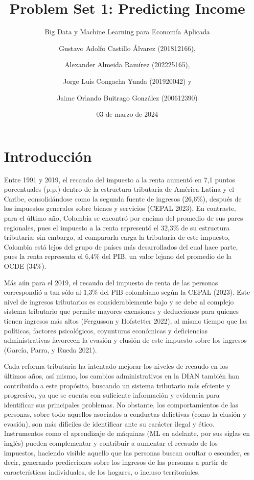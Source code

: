 \documentclass[
  11pt,
  letterpaper,
]{article}
\title{Problem Set 1: Predicting Income}
\subtitle{Big Data y Machine Learning para Economía Aplicada}
\author{Gustavo Adolfo Castillo Álvarez (201812166), \and Alexander
Almeida Ramírez (202225165), \and Jorge Luis Congacha Yunda (201920042)
y \and Jaime Orlando Buitrago González (200612390)}
\date{03 de marzo de 2024}
\begin{document}
\maketitle

\hypertarget{introducciuxf3n}{%
\section{Introducción}\label{introducciuxf3n}}

Entre 1991 y 2019, el recaudo del impuesto a la renta aumentó en 7,1
puntos porcentuales (p.p.) dentro de la estructura tributaria de América
Latina y el Caribe, consolidándose como la segunda fuente de ingresos
(26,6\%), después de los impuestos generales sobre bienes y servicios
(CEPAL 2023). En contraste, para el último año, Colombia se encontró por
encima del promedio de sus pares regionales, pues el impuesto a la renta
representó el 32,3\% de su estructura tributaria; sin embargo, al
compararla carga la tributaria de este impuesto, Colombia está lejos del
grupo de países más desarrollados del cual hace parte, pues la renta
representa el 6,4\% del PIB, un valor lejano del promedio de la OCDE
(34\%).

Más aún para el 2019, el recaudo del impuesto de renta de las personas
correspondió a tan sólo al 1,3\% del PIB colombiano según la CEPAL
(2023). Este nivel de ingresos tributarios es considerablemente bajo y
se debe al complejo sistema tributario que permite mayores exensiones y
deducciones para quienes tienen ingresos más altos (Fergusson y
Hofstetter 2022), al mismo tiempo que las políticas, factores
psicológicos, coyunturas económicas y deficiencias administrativas
favorecen la evasión y elusión de este impuesto sobre los ingresos
(García, Parra, y Rueda 2021).

Cada reforma tributaria ha intentado mejorar los niveles de recaudo en
los últimos años, así mismo, los cambios administrativos en la DIAN
también han contribuido a este propósito, buscando un sistema tributario
más efciente y progresivo, ya que se cuenta con suficiente información y
evidencia para identificar sus principales problemas. No obstante, los
comportamientos de las personas, sobre todo aquellos asociados a
conductas delictivas (como la elusión y evasión), son más difíciles de
identificar ante su carácter ilegal y ético. Instrumentos como el
aprendizaje de máquinas (ML en adelante, por sus siglas en inglés)
pueden complementar y contribuir a aumentar el recaudo de los impuestos,
haciendo visible aquello que las personas buscan ocultar o esconder, es
decir, generando predicciones sobre los ingresos de las personas a
partir de características individuales, de los hogares, o incluso
territoriales.
\end{document}
